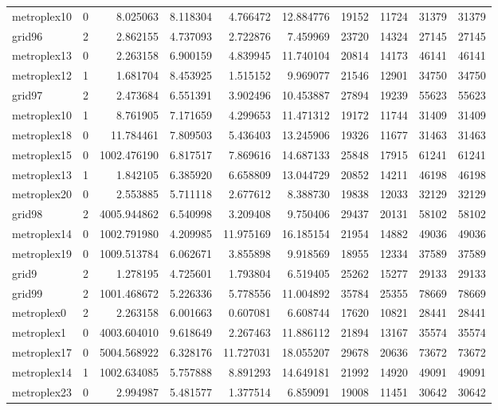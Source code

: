 \begin{longtable}{|l|r|r|r|r|r|r|r|r|r|}
metroplex10 & 0 & 8.025063 & 8.118304 & 4.766472 & 12.884776 & 19152 & 11724 & 31379 & 31379 \\
grid96 & 2 & 2.862155 & 4.737093 & 2.722876 & 7.459969 & 23720 & 14324 & 27145 & 27145 \\
metroplex13 & 0 & 2.263158 & 6.900159 & 4.839945 & 11.740104 & 20814 & 14173 & 46141 & 46141 \\
metroplex12 & 1 & 1.681704 & 8.453925 & 1.515152 & 9.969077 & 21546 & 12901 & 34750 & 34750 \\
grid97 & 2 & 2.473684 & 6.551391 & 3.902496 & 10.453887 & 27894 & 19239 & 55623 & 55623 \\
metroplex10 & 1 & 8.761905 & 7.171659 & 4.299653 & 11.471312 & 19172 & 11744 & 31409 & 31409 \\
metroplex18 & 0 & 11.784461 & 7.809503 & 5.436403 & 13.245906 & 19326 & 11677 & 31463 & 31463 \\
metroplex15 & 0 & 1002.476190 & 6.817517 & 7.869616 & 14.687133 & 25848 & 17915 & 61241 & 61241 \\
metroplex13 & 1 & 1.842105 & 6.385920 & 6.658809 & 13.044729 & 20852 & 14211 & 46198 & 46198 \\
metroplex20 & 0 & 2.553885 & 5.711118 & 2.677612 & 8.388730 & 19838 & 12033 & 32129 & 32129 \\
grid98 & 2 & 4005.944862 & 6.540998 & 3.209408 & 9.750406 & 29437 & 20131 & 58102 & 58102 \\
metroplex14 & 0 & 1002.791980 & 4.209985 & 11.975169 & 16.185154 & 21954 & 14882 & 49036 & 49036 \\
metroplex19 & 0 & 1009.513784 & 6.062671 & 3.855898 & 9.918569 & 18955 & 12334 & 37589 & 37589 \\
grid9 & 2 & 1.278195 & 4.725601 & 1.793804 & 6.519405 & 25262 & 15277 & 29133 & 29133 \\
grid99 & 2 & 1001.468672 & 5.226336 & 5.778556 & 11.004892 & 35784 & 25355 & 78669 & 78669 \\
metroplex0 & 2 & 2.263158 & 6.001663 & 0.607081 & 6.608744 & 17620 & 10821 & 28441 & 28441 \\
metroplex1 & 0 & 4003.604010 & 9.618649 & 2.267463 & 11.886112 & 21894 & 13167 & 35574 & 35574 \\
metroplex17 & 0 & 5004.568922 & 6.328176 & 11.727031 & 18.055207 & 29678 & 20636 & 73672 & 73672 \\
metroplex14 & 1 & 1002.634085 & 5.757888 & 8.891293 & 14.649181 & 21992 & 14920 & 49091 & 49091 \\
metroplex23 & 0 & 2.994987 & 5.481577 & 1.377514 & 6.859091 & 19008 & 11451 & 30642 & 30642 \\

\end{longtable}
